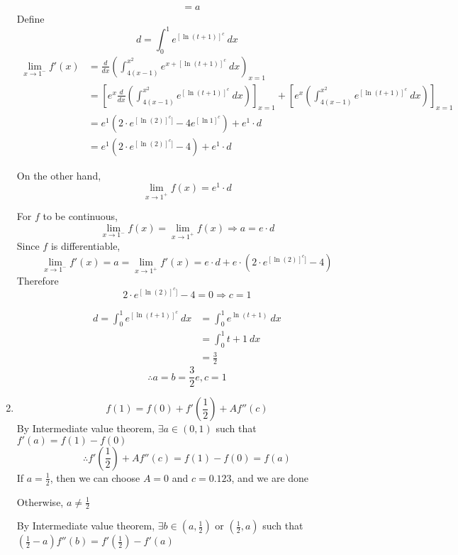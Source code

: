 \documentclass[12pt]{article}
\theoremstyle{definition}
\begin{document}
\begin{enumerate}
\begin{align*}
          &= a 
        \end{align*}
        Define
        \[d = \int_{0}^{1} e^{[\ln(t+1)]^c}\ dx\]
        \begin{align*}
          \lim_{x\to 1^-}f'(x) &= \frac{d}{dx} \left(\int_{4(x-1)}^{x^2} e^{x+[\ln(t+1)]^c}\ dx\right)_{x=1} \\
          &= \left[e^x \frac{d}{dx} \left(\int_{4(x-1)}^{x^2} e^{[\ln(t+1)]^c}\ dx\right)\right]_{x=1} + \left[e^x \left(\int_{4(x-1)}^{x^2} e^{[\ln(t+1)]^c}\ dx\right)\right]_{x=1} \\
          &= e^1 (2\cdot e^{[\ln(2)]^c]} - 4e^{[\ln 1]^c})+e^1\cdot d \\
          &= e^1 (2\cdot e^{[\ln(2)]^c]} - 4)+e^1\cdot d
        \end{align*}

        On the other hand,
        \[\lim_{x\rightarrow 1^+} f(x) = e^1 \cdot d\]

        For $f$ to be continuous,
        \[\lim_{x\rightarrow 1^-} f(x) = \lim_{x\rightarrow 1^+} f(x) \Rightarrow a = e\cdot d\]
        Since $f$ is differentiable,
        \[\lim_{x\rightarrow 1^-} f'(x) = a = \lim_{x\rightarrow 1^+} f'(x) = e\cdot d + e\cdot(2\cdot e^{[\ln(2)]^c]} - 4)\]
        Therefore
        \[2\cdot e^{[\ln(2)]^c]} - 4 = 0 \Rightarrow c=1\]
        
        \begin{align*}
          d = \int_{0}^{1} e^{[\ln(t+1)]^c}\ dx &= \int_{0}^{1} e^{\ln(t+1)}\ dx \\
            &= \int_{0}^{1} t+1 \ dx \\
            &= \frac{3}{2}
        \end{align*}
        \[\therefore a=b=\frac{3}{2}e,c=1\]

  \item
        \begin{equation*}
          f(1) = f(0) + f'\left(\frac{1}{2}\right) + Af''(c)
        \end{equation*}
        By Intermediate value theorem, $\exists a \in (0,1)$ such that $f'(a) = f(1) - f(0)$
        \begin{equation*}
          \therefore f'\left(\frac{1}{2}\right) + Af''(c) = f(1) - f(0) = f(a)
        \end{equation*}
        If $a=\frac{1}{2}$, then we can choose $A=0$ and $c=0.123$, and we are done

        Otherwise, $a\neq \frac{1}{2}$

        By Intermediate value theorem, $\exists b \in (a,\frac{1}{2})$ or $(\frac{1}{2},a)$ such that $(\frac{1}{2}-a)f''(b) = f'(\frac{1}{2}) - f'(a)$


\end{enumerate}
\end{document}

